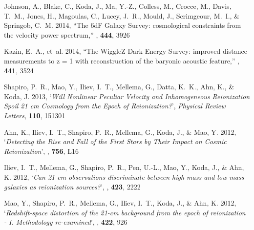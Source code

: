 \begin{thebibliography}{8}
{Johnson}, A., {Blake}, C., {Koda}, J., {Ma}, Y.-Z., {Colless}, M., {Crocce},
  M., {Davis}, T.~M., {Jones}, H., {Magoulas}, C., {Lucey}, J.~R., {Mould}, J.,
  {Scrimgeour}, M.~I., \& {Springob}, C.~M. 2014, ``{The 6dF Galaxy Survey:
  cosmological constraints from the velocity power spectrum},'' {\em \mnras\/},
  {\bf 444}, 3926

{Kazin}, E.~A., {et~al.} 2014, ``{The WiggleZ Dark Energy Survey: improved
  distance measurements to z = 1 with reconstruction of the baryonic acoustic
  feature},'' {\em \mnras\/}, {\bf 441}, 3524

{Shapiro}, P.~R., {Mao}, Y., {Iliev}, I.~T., {Mellema}, G., {Datta}, K.~K.,
  {Ahn}, K., \& {Koda}, J. 2013, `{\it Will Nonlinear Peculiar Velocity and
  Inhomogeneous Reionization Spoil 21 cm Cosmology from the Epoch of
  Reionization?}', {\em Physical Review Letters\/}, {\bf 110}, 151301

{Ahn}, K., {Iliev}, I.~T., {Shapiro}, P.~R., {Mellema}, G., {Koda}, J., \&
  {Mao}, Y. 2012, `{\it Detecting the Rise and Fall of the First Stars by Their
  Impact on Cosmic Reionization}', {\em \apjl\/}, {\bf 756}, L16

{Iliev}, I.~T., {Mellema}, G., {Shapiro}, P.~R., {Pen}, U.-L., {Mao}, Y.,
  {Koda}, J., \& {Ahn}, K. 2012, `{\it Can 21-cm observations discriminate between
  high-mass and low-mass galaxies as reionization sources?}', {\em \mnras\/},
  {\bf 423}, 2222

{Mao}, Y., {Shapiro}, P.~R., {Mellema}, G., {Iliev}, I.~T., {Koda}, J., \&
  {Ahn}, K. 2012, `{\it Redshift-space distortion of the 21-cm background from the
  epoch of reionization - I. Methodology re-examined}', {\em \mnras\/}, {\bf
  422}, 926


\end{thebibliography}
